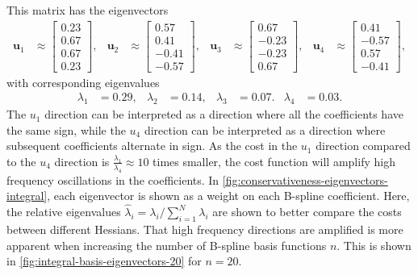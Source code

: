 This matrix has the eigenvectors 
\begin{equation}
    \begin{aligned}
        \mathbf u_1 &\approx \begin{bmatrix}  
            0.23 \\  0.67 \\  0.67 \\  0.23 
        \end{bmatrix}, &
        \mathbf u_2 &\approx \begin{bmatrix}         
            0.57 \\  0.41 \\ -0.41 \\  -0.57 
        \end{bmatrix}, &
        \mathbf u_3 &\approx \begin{bmatrix}         
            0.67 \\  -0.23 \\  -0.23 \\  0.67 
        \end{bmatrix}, &
        \mathbf u_4 &\approx \begin{bmatrix}         
            0.41 \\  -0.57 \\  0.57 \\  -0.41 
        \end{bmatrix},
    \end{aligned}
\end{equation}
with corresponding eigenvalues
\begin{equation}
    \begin{aligned}
        \lambda_1 &= 0.29, &
        \lambda_2 &= 0.14, &
        \lambda_3 &= 0.07. &
        \lambda_4 &= 0.03.
    \end{aligned}
\end{equation}
The $u_1$ direction can be interpreted as a direction where all the coefficients have the same sign, while the $u_4$ direction can be interpreted as a direction where subsequent coefficients alternate in sign. 
As the cost in the $u_1$ direction compared to the $u_4$ direction is $\frac{\lambda_1}{\lambda_4} \approx 10$ times smaller, the cost function will amplify high frequency oscillations in the coefficients. In \cref{fig:conservativeness-eigenvectors-integral}, each eigenvector is shown as a weight on each B-spline coefficient. Here, the relative eigenvalues $\hat\lambda_i = \lambda_i/\sum_{i=1}^{N} \lambda_i$ are shown to better compare the costs between different Hessians. That high frequency directions are amplified is more apparent when increasing the number of B-spline basis functions $n$. This is shown in \cref{fig:integral-basis-eigenvectors-20} for $n=20$.


